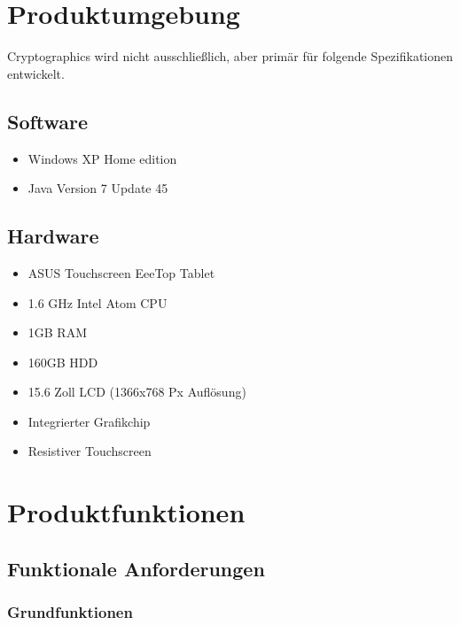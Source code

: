 \documentclass{article}
\begin{document}
\section{Produktumgebung}

\gls{Cryptographics} wird nicht ausschließlich, aber primär für folgende Spezifikationen entwickelt.

\subsection{Software}

\begin{itemize}
	\item Windows XP Home edition
	\item Java Version 7 Update 45
\end{itemize}

\subsection{Hardware}

\begin{itemize}
	\item ASUS Touchscreen EeeTop Tablet
	\item 1.6 GHz Intel Atom CPU
	\item 1GB RAM
	\item 160GB HDD
	\item 15.6 Zoll LCD (1366x768 Px Auflösung)
	\item Integrierter Grafikchip
	\item Resistiver Touchscreen
\end{itemize}

\section{Produktfunktionen}

\subsection{Funktionale Anforderungen}

\subsubsection{Grundfunktionen}
\end{document}
